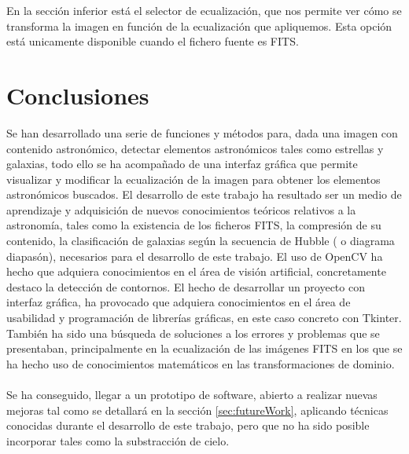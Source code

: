 \begin{itemize}
\begin{figure}[!htb]
				\caption{\label{fig:BarraDerecha}}
			\end{figure}
		En la sección inferior está el selector de ecualización, que nos permite ver cómo se transforma la imagen en función de la ecualización que apliquemos. Esta opción está unicamente disponible cuando el fichero fuente es FITS.
		
	\end{itemize}

	\newpage
	\section{Conclusiones}
	Se han desarrollado una serie de funciones y métodos para, dada una imagen con contenido astronómico, detectar elementos astronómicos tales como estrellas y galaxias, todo ello se ha acompañado de una interfaz gráfica que permite visualizar y modificar la ecualización de la imagen para obtener los elementos astronómicos buscados.
	El desarrollo de este trabajo ha resultado ser un medio de aprendizaje y
	adquisición de nuevos conocimientos teóricos relativos a la astronomía, tales como la existencia de los ficheros FITS, la compresión de su contenido, la clasificación de galaxias según la secuencia de Hubble ( o diagrama diapasón), necesarios para el desarrollo de este trabajo.
	El uso de OpenCV ha hecho que adquiera conocimientos en el área de visión artificial, concretamente destaco la detección de contornos.
	El hecho de desarrollar un proyecto con interfaz gráfica, ha provocado que adquiera conocimientos en el área de usabilidad y programación de librerías gráficas, en este caso concreto con Tkinter.
	También ha sido una búsqueda de soluciones a los errores y problemas que se presentaban, principalmente en la ecualización de las imágenes FITS en los que se ha hecho uso de conocimientos matemáticos en las transformaciones de dominio.\\ \\

	Se ha conseguido, llegar a un prototipo de software, abierto a realizar nuevas mejoras tal como se detallará en la sección \ref{sec:futureWork}, aplicando técnicas conocidas durante el desarrollo de este trabajo, pero que no ha sido posible incorporar tales como la substracción de cielo.
	\\
	\newline

